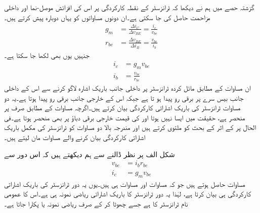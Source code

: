 گزشتہ حصے میں ہم نے دیکھا کہ ٹرانزسٹر کے نقطہ کارکردگی پر اس کی افزائش موصل-نما   اور داخلی مزاحمت   حاصل کی جا سکتی ہے۔ان دونوں مساواتوں کو یہاں دوبارہ پیش کرتے ہیں۔
\begin{align}
g_m &=\frac{\Delta i_C}{\Delta v_{BE}}=\frac{i_c}{v_{be}}\\
r_{be}&=\frac{\Delta v_{BE}}{\Delta i_B}=\frac{v_{be}}{i_b}
\end{align}
جنہیں یوں بھی لکھا جا سکتا ہے۔
\begin{align}
i_c &= g_m v_{be} \label{مساوات_ٹرانزسٹر_باریک_اشارات_کلکٹر _رو} \\
i_b&=\frac{v_{be}}{r_{be}} \label{مساوات_ٹرانزسٹر_باریک_اشارات_قابو_رو}
\end{align}
ان مساوات کے مطابق مائل کردہ ٹرانزسٹر پر داخلی جانب باریک اشارہ  لاگو کرنے سے اس کے داخلی جانب  بیس سرے پر برقی رو  پیدا ہو تا ہے جبکہ اس کے خارجی جانب برقی رو  پیدا ہوتا ہے۔یہ دو مساوات ٹرانزسٹر کی باریک اشاراتی کارکردگی بیان کرتے ہیں۔اگرچہ مساوات   کے مطابق  صرف  پر منحصر ہے، حقیقت میں ایسا نہیں ہوتا اور   کی قیمت خارجی برقی دباؤ  پر بھی منحصر ہوتا ہے۔فی الحال  پر  کے اثر کے بحث کو ملتوی کرتے ہیں اور مندرجہ بالا دو مساوات کو ٹرانزسٹر کی مکمل باریک اشاراتی کارکردگی بیان کرنے والے مساوات مان لیتے ہیں۔

شکل  الف پر نظر ڈالنے سے ہم دیکھتے ہیں کہ  اس دور سے 
\begin{align*}
v_{be}&=i_b r_{be}\\
i_c &=g_m v_{be}
\end{align*}
مساوات حاصل ہوتے ہیں جو کہ مساوات   اور مساوات   ہی ہیں۔یوں یہ دور ٹرانزسٹر کی باریک اشاراتی کارکردگی ہی بیان کرتا ہے، لہٰذا یہ دور ٹرانزسٹر کا باریک اشاراتی ریاضی نمونہ ہی ہے۔اس کا عمومی نام ٹرانزسٹر کا     ہے جسے چھوٹا کر کے صرف   ریاضی نمونہ یا  پکارا جاتا ہے۔

